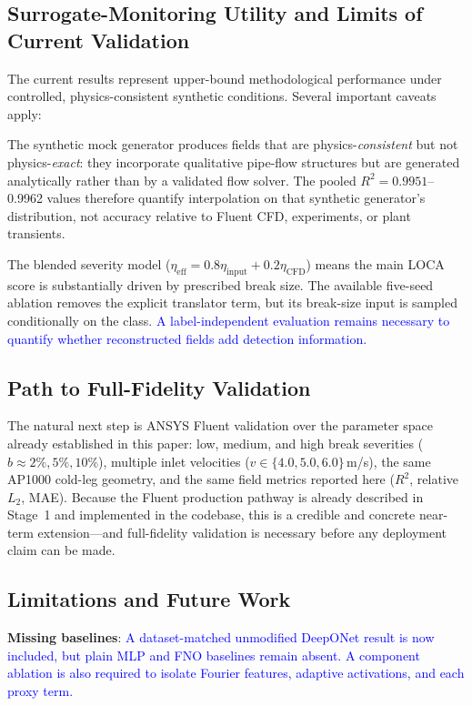 \documentclass[journal]{IEEEtran}
\newcommand{\added}[1]{\textcolor{blue}{#1}}
\begin{document}
\subsection{Surrogate-Monitoring Utility and Limits of Current Validation}

The current results represent upper-bound methodological performance under controlled, physics-consistent synthetic conditions. Several important caveats apply:

The synthetic mock generator produces fields that are physics-\emph{consistent} but not physics-\emph{exact}: they incorporate qualitative pipe-flow structures but are generated analytically rather than by a validated flow solver. The pooled $R^2=0.9951$--0.9962 values therefore quantify interpolation on that synthetic generator's distribution, not accuracy relative to Fluent CFD, experiments, or plant transients.

The blended severity model ($\eta_\text{eff}=0.8\eta_\text{input}+0.2\eta_\text{CFD}$) means the main LOCA score is substantially driven by prescribed break size. The available five-seed ablation removes the explicit translator term, but its break-size input is sampled conditionally on the class.  \added{A label-independent evaluation remains necessary to quantify whether reconstructed fields add detection information.}

\subsection{Path to Full-Fidelity Validation}

The natural next step is ANSYS Fluent validation over the parameter space already established in this paper: low, medium, and high break severities ($b \approx 2\%, 5\%, 10\%$), multiple inlet velocities ($v \in \{4.0, 5.0, 6.0\}$\,m/s), the same AP1000 cold-leg geometry, and the same field metrics reported here ($R^2$, relative $L_2$, MAE). Because the Fluent production pathway is already described in Stage~1 and implemented in the codebase, this is a credible and concrete near-term extension---and full-fidelity validation is necessary before any deployment claim can be made.

\subsection{Limitations and Future Work}
\label{sec:limitations}

\textbf{Missing baselines}:  \added{A dataset-matched unmodified DeepONet result is now included, but plain MLP and FNO baselines remain absent. A component ablation is also required to isolate Fourier features, adaptive activations, and each proxy term.}
\end{document}
